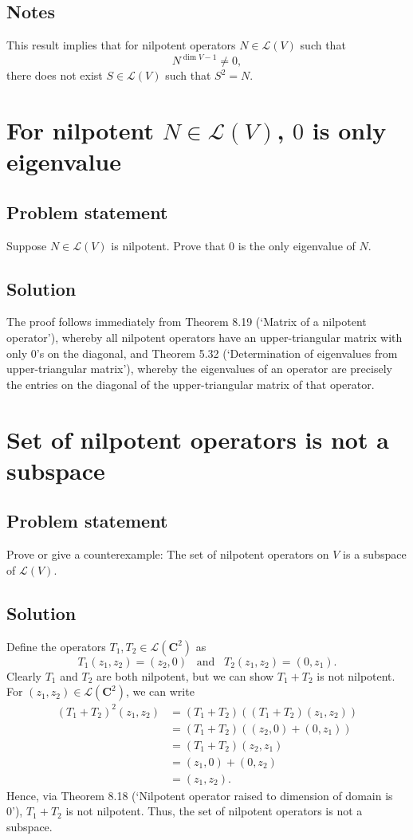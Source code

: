 \documentclass{article}
\begin{document}
\subsection*{Notes}
This result implies that for nilpotent operators $N\in\mathcal{L}(V)$ such that 
\[N^{\operatorname{dim}V-1}\neq0,\]
there does not exist $S\in\mathcal{L}(V)$ such that $S^2=N$.

\clearpage

\section{For nilpotent $N\in\mathcal{L}(V)$, $0$ is only eigenvalue}
\subsection*{Problem statement}
Suppose $N\in\mathcal{L}(V)$ is nilpotent. Prove that $0$ is the only eigenvalue of $N$.

\subsection*{Solution}
The proof follows immediately from Theorem 8.19 (`Matrix of a nilpotent operator'), whereby all nilpotent operators have an upper-triangular matrix with only $0$'s on the diagonal, and Theorem 5.32 (`Determination of eigenvalues from upper-triangular matrix'), whereby the eigenvalues of an operator are precisely the entries on the diagonal of the upper-triangular matrix of that operator.


\clearpage

\section{Set of nilpotent operators is not a subspace}
\subsection*{Problem statement}
Prove or give a counterexample: The set of nilpotent operators on $V$ is a subspace of $\mathcal{L}(V)$.

\subsection*{Solution}
Define the operators $T_1,T_2\in\mathcal{L}(\mathbf{C}^2)$ as 
\[T_1(z_1,z_2)=(z_2,0)\;\;\;\text{and}\;\;\;T_2(z_1,z_2)=(0,z_1).\]
Clearly $T_1$ and $T_2$ are both nilpotent, but we can show $T_1+T_2$ is not nilpotent. For $(z_1,z_2)\in\mathcal{L}(\mathbf{C}^2)$, we can write
\begin{align*}
    (T_1+T_2)^2(z_1,z_2)&=(T_1+T_2)((T_1+T_2)(z_1,z_2))\\
    &=(T_1+T_2)((z_2,0)+(0,z_1))\\
    &=(T_1+T_2)(z_2,z_1)\\
    &=(z_1,0)+(0,z_2)\\
    &=(z_1,z_2).
\end{align*}
Hence, via Theorem 8.18 (`Nilpotent operator raised to dimension of domain is 0'), $T_1+T_2$ is not nilpotent. Thus, the set of nilpotent operators is not a subspace.
\end{document}
